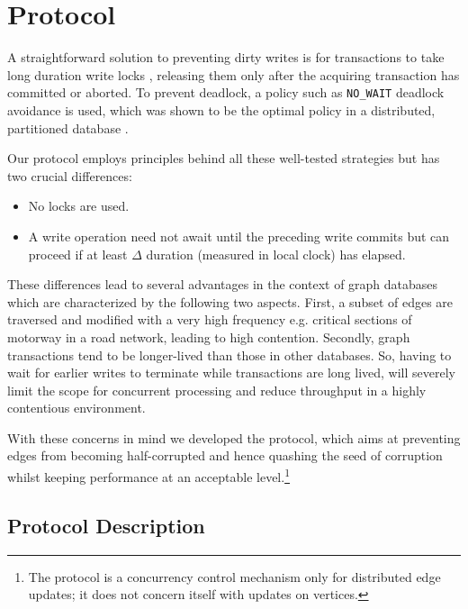 \section{\tDelta Protocol}
\label{sec:tdelta-protocol}

A straightforward solution to preventing dirty writes is for transactions to take long duration write locks \cite{Berenson1995}, releasing them only after the acquiring transaction has committed or aborted. To prevent deadlock, a policy such as \texttt{NO_WAIT} deadlock avoidance is used, which was shown to be the optimal policy in a distributed, partitioned database \cite{Harding2017}.

Our \tDelta protocol employs principles behind all these well-tested strategies but has two crucial differences:
\begin{itemize}
\item No locks are used.
\item A write operation need not await until the preceding write commits but can proceed if at least $\Delta$ duration (measured in local clock) has elapsed.
\end{itemize}

These differences lead to several advantages in the context of graph databases which are characterized by the following two aspects.
First, a subset of edges are traversed and modified with a very high frequency e.g. critical sections of motorway in a road network, leading to high contention.
Secondly, graph transactions tend to be longer-lived than those in other databases.
So, having to wait for earlier writes to terminate while transactions are long lived, will severely limit the scope for concurrent processing and reduce throughput in a highly contentious environment.

With these concerns in mind we developed the \tDelta protocol, which aims at preventing edges from becoming half-corrupted and hence quashing the seed of corruption whilst keeping performance at an acceptable level.\footnote{The \tDelta protocol is a concurrency control mechanism only for distributed edge updates; it does not concern itself with updates on  vertices.}

\subsection{Protocol Description}
\label{sec:protocol-description}


